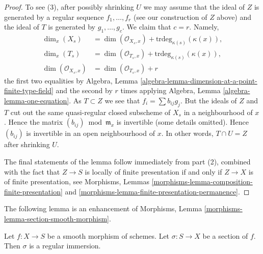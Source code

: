 \begin{proof}
\medskip\noindent
To see (3), after possibly shrinking $U$ we may assume that
the ideal of $Z$ is generated by a regular sequence $f_1, \ldots, f_r$
(see our construction of $Z$ above)
and the ideal of $T$ is generated by $g_1, \ldots, g_c$.
We claim that $c = r$. Namely,
\begin{align*}
\dim_x(X_s) & = \dim(\mathcal{O}_{X_s, x}) +
\text{trdeg}_{\kappa(s)}(\kappa(x)), \\
\dim_x(T_s) & = \dim(\mathcal{O}_{T_s, x}) +
\text{trdeg}_{\kappa(s)}(\kappa(x)), \\
\dim(\mathcal{O}_{X_s, x}) & = \dim(\mathcal{O}_{T_s, x}) + r
\end{align*}
the first two equalities by
Algebra, Lemma \ref{algebra-lemma-dimension-at-a-point-finite-type-field}
and the second by $r$ times applying
Algebra, Lemma \ref{algebra-lemma-one-equation}.
As $T \subset Z$ we see that
$f_i = \sum b_{ij} g_j$. But the ideals of $Z$ and $T$ cut out the same
quasi-regular closed subscheme of $X_s$ in a neighbourhood of $x$. Hence
the matrix $(b_{ij}) \bmod \mathfrak m_x$ is invertible (some details
omitted). Hence $(b_{ij})$ is invertible in an
open neighbourhood of $x$. In other words,
$T \cap U = Z$ after shrinking $U$.

\medskip\noindent
The final statements of the lemma follow immediately from
part (2), combined with the fact that $Z \to S$
is locally of finite presentation if and only if $Z \to X$ is
of finite presentation, see
Morphisms, Lemmas \ref{morphisms-lemma-composition-finite-presentation} and
\ref{morphisms-lemma-finite-presentation-permanence}.
\end{proof}

\noindent
The following lemma is an enhancement of
Morphisms, Lemma \ref{morphisms-lemma-section-smooth-morphism}.

\begin{lemma}
\label{lemma-section-smooth-regular-immersion}
Let $f : X \to S$ be a smooth morphism of schemes.
Let $\sigma : S \to X$ be a section of $f$.
Then $\sigma$ is a regular immersion.
\end{lemma}

